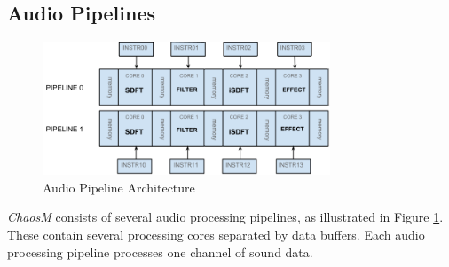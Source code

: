 \FloatBarrier
\subsection{Audio Pipelines}\label{subsec:audio_pipelines}

\begin{figure}[H]
    \centering
    \includegraphics[height=150px]{figures/fpga/system_components_general_pipeline.png}
    \caption{Audio Pipeline Architecture}
    \label{fig:pipeline_architecture}
\end{figure}

\textit{ChaosM} consists of several audio processing pipelines, as illustrated in
Figure \ref{fig:pipeline_architecture}. These contain several processing cores
separated by data buffers. Each audio processing pipeline processes one channel
of sound data.

